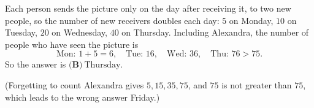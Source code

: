Each person sends the picture only on the day after receiving it, to two new people, so the number of new receivers doubles each day: $5$ on Monday, $10$ on Tuesday, $20$ on Wednesday, $40$ on Thursday. Including Alexandra, the number of people who have seen the picture is
\[\text{Mon: }1+5=6,\quad\text{Tue: }16,\quad\text{Wed: }36,\quad\text{Thu: }76>75.\]
So the answer is $\boxed{\textbf{(B)}\ \text{Thursday}}$.

(Forgetting to count Alexandra gives $5,15,35,75$, and $75$ is not greater than $75$, which leads to the wrong answer Friday.)
